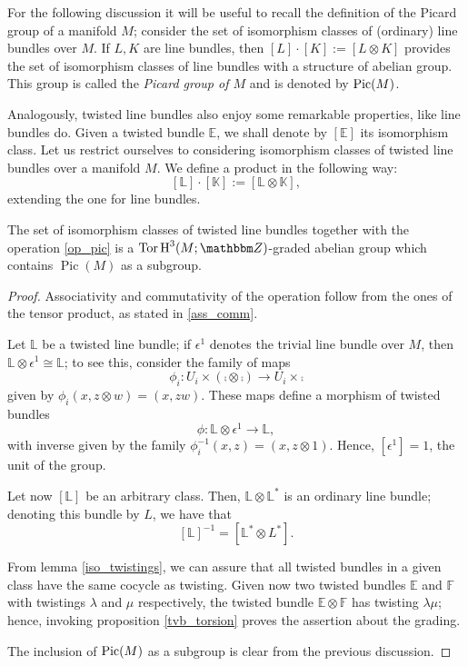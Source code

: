 For the following discussion it will be useful to recall the definition of the Picard group of a manifold $M$; consider the set of isomorphism classes of (ordinary) line bundles over $M$. If $L,K$ are line bundles, then $[L]\cdot [K]:=[L\otimes K]$ provides the set of isomorphism classes of line bundles with a structure of abelian group. This group is called the \emph{Picard group of $M$} and is denoted by $\operatorname{Pic}(M)$.

Analogously, twisted line bundles also enjoy some remarkable properties, like line bundles do. Given a twisted bundle $\mathbb{E}$, we shall denote by $[\mathbb{E}]$ its isomorphism class. Let us restrict ourselves to considering isomorphism classes of twisted line bundles over a manifold $M$. We define a product in the following way:
\begin{equation}\label{op_pic}
[\mathbb{L}]\cdot [\mathbb{K}]:=[\mathbb{L}\otimes \mathbb{K}],
\end{equation}
extending the one for line bundles.

\begin{theorem}
The set of isomorphism classes of twisted line bundles together with the operation \eqref{op_pic} is a $\opnm{Tor}\opnm{H}^3(M;\ent )$-graded abelian group which contains $\operatorname{Pic}(M)$ as a subgroup.
\end{theorem}
\begin{proof}
Associativity and commutativity of the operation follow from the ones of the tensor product, as stated in \ref{ass_comm}.

Let $\mathbb{L}$ be a twisted line bundle; if $\epsilon^1$ denotes the trivial line bundle over $M$, then $\mathbb{L}\otimes \epsilon^1\cong \mathbb{L}$; to see this, consider the family of maps
$$\phi_i:U_i\times (\comp \otimes \comp )\longrightarrow U_i\times \comp$$
given by $\phi_i(x,z\otimes w)=(x,zw)$. These maps define a morphism of twisted bundles
$$\phi :\mathbb{L}\otimes \epsilon^1\longrightarrow \mathbb{L},$$
with inverse given by the family $\phi_i^{-1}(x,z)=(x,z\otimes 1)$. Hence, $[\epsilon^1]=1$, the unit of the group.

Let now $[\mathbb{L}]$ be an arbitrary class. Then, $\mathbb{L} \otimes \mathbb{L}^*$ is an ordinary line bundle; denoting this bundle by $L$, we have that
$$[\mathbb{L}]^{-1}=[\mathbb{L}^*\otimes L^*].$$

From lemma \ref{iso_twistings}, we can assure that all twisted bundles in a given class have the same cocycle as twisting. Given now two twisted bundles $\mathbb{E}$ and $\mathbb{F}$ with twistings $\lambda$ and $\mu$ respectively, the twisted bundle $\mathbb{E}\otimes \mathbb{F}$ has twisting $\lambda \mu$; hence, invoking proposition \ref{tvb_torsion} proves the assertion about the grading.

The inclusion of $\operatorname{Pic}(M)$ as a subgroup is clear from the previous discussion.
\end{proof}

